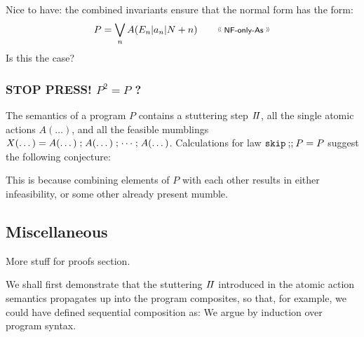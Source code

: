 Nice to have:
the combined invariants ensure that the normal form
has the form:
\[
  P = \bigvee_n A(E_n|a_n|N+n)  \qquad \elabel{NF-only-As}
\]
Is this the case?

\subsubsection{STOP PRESS! $P^2=P$ ?}

The semantics of a program $P$
contains a stuttering step $I\!I$,
all the single atomic actions $A(\dots)$,
and all the feasible mumblings
$X(\dots) = A(\dots) \seq A(\dots) \seq \dots \seq A(\dots)$.
Calculations for law $\texttt{skip}\mathbin{;\!;} P = P$ suggest the following conjecture:
\begin{center}
\end{center}
This is because combining elements of $P$ with each other results
in either infeasibility, or some other already present mumble.

\newpage
\subsection{Miscellaneous}

More stuff for proofs section.


We shall first demonstrate that the stuttering $I\!I$
introduced in the atomic action semantics
propagates up into the program composites,
so that, for example, we could have defined sequential composition
as:
We argue by induction over program syntax.

